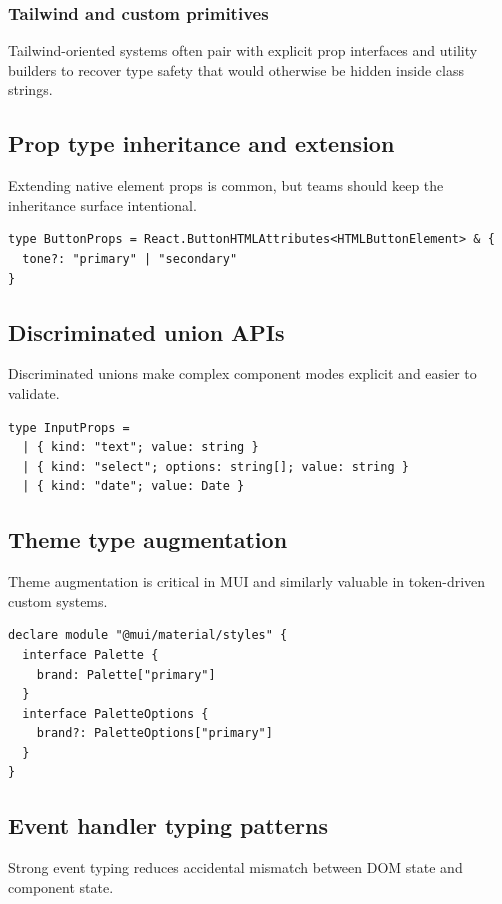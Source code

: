 \subsubsection{Tailwind and custom primitives}
Tailwind-oriented systems often pair with explicit prop interfaces and utility builders to recover type safety that would otherwise be hidden inside class strings.

\subsection{Prop type inheritance and extension}
Extending native element props is common, but teams should keep the inheritance surface intentional.

\begin{verbatim}
type ButtonProps = React.ButtonHTMLAttributes<HTMLButtonElement> & {
  tone?: "primary" | "secondary"
}
\end{verbatim}

\subsection{Discriminated union APIs}
Discriminated unions make complex component modes explicit and easier to validate.

\begin{verbatim}
type InputProps =
  | { kind: "text"; value: string }
  | { kind: "select"; options: string[]; value: string }
  | { kind: "date"; value: Date }
\end{verbatim}

\subsection{Theme type augmentation}
Theme augmentation is critical in MUI and similarly valuable in token-driven custom systems.

\begin{verbatim}
declare module "@mui/material/styles" {
  interface Palette {
    brand: Palette["primary"]
  }
  interface PaletteOptions {
    brand?: PaletteOptions["primary"]
  }
}
\end{verbatim}

\subsection{Event handler typing patterns}
Strong event typing reduces accidental mismatch between DOM state and component state.

